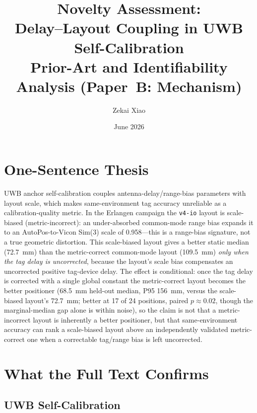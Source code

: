 \documentclass[11pt,a4paper]{article}
\title{Novelty Assessment:\\
       Delay--Layout Coupling in UWB Self-Calibration\\[5pt]
       \large Prior-Art and Identifiability Analysis (Paper~B: Mechanism)}
\author{Zekai Xiao}
\date{June 2026}
\begin{document}
\maketitle

\section{One-Sentence Thesis}

UWB anchor self-calibration couples antenna-delay/range-bias parameters with layout scale, which makes same-environment tag accuracy unreliable as a calibration-quality metric. In the Erlangen campaign the \texttt{v4-io} layout is scale-biased (metric-incorrect): an under-absorbed common-mode range bias expands it to an AutoPos-to-Vicon Sim(3) scale of 0.958---this is a range-bias signature, not a true geometric distortion. This scale-biased layout gives a better static median (72.7~mm) than the metric-correct common-mode layout (109.5~mm) \emph{only when the tag delay is uncorrected}, because the layout's scale bias compensates an uncorrected positive tag-device delay. The effect is conditional: once the tag delay is corrected with a single global constant the metric-correct layout becomes the better positioner (68.5~mm held-out median, P95 156~mm, versus the scale-biased layout's 72.7~mm; better at 17 of 24 positions, paired $p\approx0.02$, though the marginal-median gap alone is within noise), so the claim is not that a metric-incorrect layout is inherently a better positioner, but that same-environment accuracy can rank a scale-biased layout above an independently validated metric-correct one when a correctable tag/range bias is left uncorrected.

\section{What the Full Text Confirms}

\subsection{UWB Self-Calibration}
\end{document}
